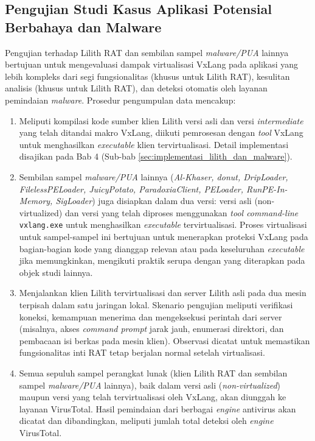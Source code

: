 \subsection{Pengujian Studi Kasus Aplikasi Potensial Berbahaya dan Malware}
\label{subsec:prosedur_malware_analysis} %
Pengujian terhadap Lilith RAT dan sembilan sampel \textit{malware/PUA} lainnya bertujuan untuk mengevaluasi dampak virtualisasi VxLang pada aplikasi yang lebih kompleks dari segi fungsionalitas (khusus untuk Lilith RAT), kesulitan analisis (khusus untuk Lilith RAT), dan deteksi otomatis oleh layanan pemindaian \textit{malware}. Prosedur pengumpulan data mencakup:
\begin{enumerate}
    \item {} Meliputi kompilasi kode sumber klien Lilith versi asli dan versi \textit{intermediate} yang telah ditandai makro VxLang, diikuti pemrosesan dengan \textit{tool} VxLang untuk menghasilkan \textit{executable} klien tervirtualisasi. Detail implementasi disajikan pada Bab 4 (Sub-bab \ref{sec:implementasi_lilith_dan_malware}).
    \item {} Sembilan sampel \textit{malware/PUA} lainnya (\textit{Al-Khaser, donut, DripLoader, FilelessPELoader, JuicyPotato, ParadoxiaClient, PELoader, RunPE-In-Memory, SigLoader}) juga disiapkan dalam dua versi: versi asli (non-virtualized) dan versi yang telah diproses menggunakan \textit{tool command-line} \texttt{vxlang.exe} untuk menghasilkan \textit{executable} tervirtualisasi. Proses virtualisasi untuk sampel-sampel ini bertujuan untuk menerapkan proteksi VxLang pada bagian-bagian kode yang dianggap relevan atau pada keseluruhan \textit{executable} jika memungkinkan, mengikuti praktik serupa dengan yang diterapkan pada objek studi lainnya.
    \item {} Menjalankan klien Lilith tervirtualisasi dan server Lilith asli pada dua mesin terpisah dalam satu jaringan lokal. Skenario pengujian meliputi verifikasi koneksi, kemampuan menerima dan mengeksekusi perintah dari server (misalnya, akses \textit{command prompt} jarak jauh, enumerasi direktori, dan pembacaan isi berkas pada mesin klien). Observasi dicatat untuk memastikan fungsionalitas inti RAT tetap berjalan normal setelah virtualisasi.
    \item {} Semua sepuluh sampel perangkat lunak (klien Lilith RAT dan sembilan sampel \textit{malware/PUA} lainnya), baik dalam versi asli (\textit{non-virtualized}) maupun versi yang telah tervirtualisasi oleh VxLang, akan diunggah ke layanan VirusTotal. Hasil pemindaian dari berbagai \textit{engine} antivirus akan dicatat dan dibandingkan, meliputi jumlah total deteksi oleh \textit{engine} VirusTotal.
\end{enumerate}

